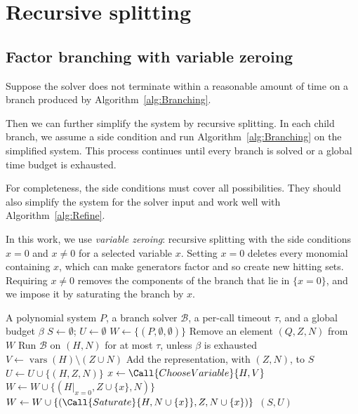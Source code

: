 \section{Recursive splitting}
\label{sec:variable-zeroing}

\subsection{Factor branching with variable zeroing}
\label{subsec:zeroing-branching}

Suppose the solver does not terminate within a reasonable amount of time on a
branch produced by Algorithm~\ref{alg:Branching}.

Then we can further simplify the system by recursive splitting. In each child
branch, we assume a side condition and run Algorithm~\ref{alg:Branching} on the
simplified system. This process continues until every branch is solved or a
global time budget is exhausted.

For completeness, the side conditions must cover all possibilities. They
should also simplify the system for the solver input and work well with
Algorithm~\ref{alg:Refine}.

In this work, we use \emph{variable zeroing}: recursive splitting with the
side conditions $x=0$ and $x\neq0$ for a selected variable $x$. Setting $x=0$
deletes every monomial containing $x$, which can make generators factor and
so create new hitting sets. Requiring $x\neq0$ removes the components of the
branch that lie in $\{x=0\}$, and we impose it by saturating the branch by
$x$.

\begin{algorithm}[htbp]
  \small
  \caption{Factor branching with variable zeroing}
  \label{alg:ZeroingBranching}
  \begin{algorithmic}[1]
    \Require A polynomial system $P$, a branch solver $\mathcal B$, a
    per-call timeout $\tau$, and a global budget $\beta$
    \State $S\gets\emptyset$; $U\gets\emptyset$ 
    \State $W\gets\{(P,\emptyset,\emptyset)\}$ 
    \State Remove an element $(Q,Z,N)$ from $W$
    \State Run $\mathcal B$ on $(H,N)$ for at most $\tau$, unless
    $\beta$ is exhausted
    \State $V\gets \operatorname{vars}(H)\setminus(Z\cup N)$
    \State Add the representation, with $(Z,N)$, to $S$
    \State $U\gets U\cup\{(H,Z,N)\}$
    \Else
    \State $x\gets\Call{ChooseVariable}{H,V}$
    \State $W\gets W\cup\{(H|_{x=0},Z\cup\{x\},N)\}$ 
    \State $W\gets
    W\cup\{(\Call{Saturate}{H,N\cup\{x\}},Z,N\cup\{x\})\}$ 
    \EndIf
    \EndFor
    \EndWhile
    \State \Return $(S,U)$
  \end{algorithmic}
\end{algorithm}

